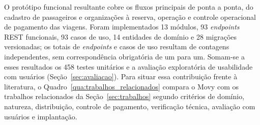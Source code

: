 \documentclass[a4paper,12pt]{article}
\begin{document}
O protótipo funcional resultante cobre os fluxos principais de ponta a ponta, do cadastro de passageiros e organizações à reserva, operação e controle operacional de pagamento das viagens. Foram implementados 13 módulos, 93 \textit{endpoints} REST funcionais, 93 casos de uso, 14 entidades de domínio e 28 migrações versionadas; os totais de \textit{endpoints} e casos de uso resultam de contagens independentes, sem correspondência obrigatória de um para um. Somam-se a esses resultados os 458 testes unitários e a avaliação exploratória de usabilidade com usuários (Seção~\ref{sec:avaliacao}). Para situar essa contribuição frente à literatura, o Quadro~\ref{qua:trabalhos_relacionados} compara o Movy com os trabalhos relacionados da Seção~\ref{sec:trabalhos} segundo critérios de domínio, natureza, distribuição, controle de pagamento, verificação técnica, avaliação com usuários e implantação.
\end{document}

